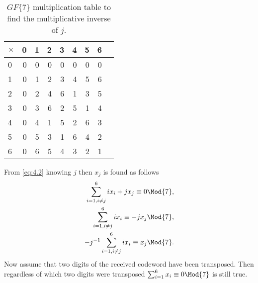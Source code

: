 \begin{table}[!htp]\centering
\begin{tabular}{|l|rrrrrrr|r}\toprule
$\times$ &0 &1 &2 &3 &4 &5 &6 \\\midrule
0 &0 &0 &0 &0 &0 &0 &0 \\
1 &0 &1 &2 &3 &4 &5 &6 \\
2 &0 &2 &4 &6 &1 &3 &5 \\
3 &0 &3 &6 &2 &5 &1 &4 \\
4 &0 &4 &1 &5 &2 &6 &3 \\
5 &0 &5 &3 &1 &6 &4 &2 \\
6 &0 &6 &5 &4 &3 &2 &1 \\
\bottomrule
\end{tabular}
\caption{$GF\{7\}$ multiplication table to find the multiplicative inverse of $j$.}\label{tab:16}
\end{table}
From \eqref{eq:4.2} knowing $j$ then $x_j$ is found as follows
\begin{align}
\label{eq:4.9}
	\sum_{i=1,i\neq j}^{6} ix_i + jx_j \equiv 0 \Mod{7},\nonumber\\
	\sum_{i=1,i\neq j}^{6} ix_i \equiv -jx_j \Mod{7}, \nonumber\\
	-j^{-1}\sum_{i=1,i\neq j}^{6} ix_i \equiv x_j \Mod{7}.
\end{align}
Now assume that two digits of the received codeword have been transposed. Then regardless of which two digits were transposed $\sum_{i=1}^6 x_i\equiv 0 \Mod{7}$ is still true. 

